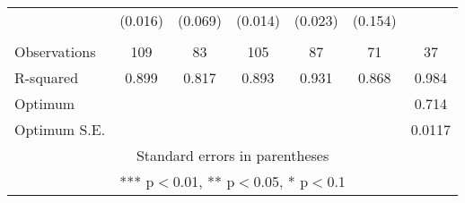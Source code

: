 \documentclass[]{article}
\begin{document}
\begin{tabular}{lcccccc}
 & (0.016) & (0.069) & (0.014) & (0.023) & (0.154) &  \\
 &  &  &  &  &  &  \\
Observations & 109 & 83 & 105 & 87 & 71 & 37 \\
R-squared & 0.899 & 0.817 & 0.893 & 0.931 & 0.868 & 0.984 \\
Optimum &  &  &  &  &  & 0.714 \\
 Optimum S.E. &  &  &  &  &  & 0.0117 \\ \hline
\multicolumn{7}{c}{ Standard errors in parentheses} \\
\multicolumn{7}{c}{ *** p$<$0.01, ** p$<$0.05, * p$<$0.1} \\
\end{tabular}
\end{document}
